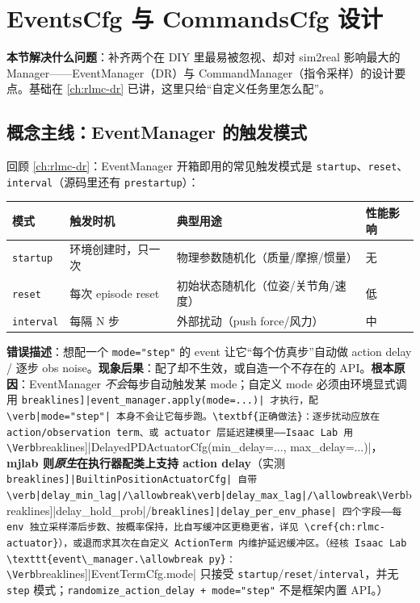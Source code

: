 \section{EventsCfg 与 CommandsCfg 设计}
\label{sec:rlmc-diy-events}

\textbf{本节解决什么问题}：补齐两个在 DIY 里最易被忽视、却对 sim2real 影响最大的 Manager——EventManager（DR）与 CommandManager（指令采样）的设计要点。基础在 \cref{ch:rlmc-dr} 已讲，这里只给“自定义任务里怎么配”。

\subsection{概念主线：EventManager 的触发模式}
\label{sec:rlmc-diy-events-mode}

回顾 \cref{ch:rlmc-dr}：EventManager 开箱即用的常见触发模式是 \verb|startup|、\verb|reset|、\verb|interval|（源码里还有 \verb|prestartup|）：

\begin{center}
\small
\begin{tabular}{@{}lp{3.6cm}p{4.4cm}l@{}}
\toprule
模式 & 触发时机 & 典型用途 & 性能影响 \\
\midrule
\verb|startup| & 环境创建时，只一次 & 物理参数随机化（质量/摩擦/惯量） & 无 \\
\verb|reset| & 每次 episode reset & 初始状态随机化（位姿/关节角/速度） & 低 \\
\verb|interval| & 每隔 N 步 & 外部扰动（push force/风力） & 中 \\
\bottomrule
\end{tabular}
\end{center}

\begin{pitfall}
\textbf{错误描述}：想配一个 \verb|mode="step"| 的 event 让它“每个仿真步”自动做 action delay / 逐步 obs noise。\textbf{现象后果}：配了却不生效，或自造一个不存在的 API。\textbf{根本原因}：EventManager \emph{不会}每步自动触发某 mode；自定义 mode 必须由环境显式调用 \Verb[breaklines]|event_manager.apply(mode=...)| 才执行，配 \verb|mode="step"| 本身不会让它每步跑。\textbf{正确做法}：逐步扰动应放在 action/observation term、或 actuator 层延迟建模里——Isaac Lab 用 \Verb[breaklines]|DelayedPDActuatorCfg(min_delay=..., max_delay=...)|，\textbf{mjlab 则\emph{原生}在执行器配类上支持 action delay}（实测 \Verb[breaklines]|BuiltinPositionActuatorCfg| 自带 \verb|delay_min_lag|/\allowbreak\verb|delay_max_lag|/\allowbreak\Verb[breaklines]|delay_hold_prob|/\allowbreak\Verb[breaklines]|delay_per_env_phase| 四个字段——每 env 独立采样滞后步数、按概率保持，比自写缓冲区更稳更省，详见 \cref{ch:rlmc-actuator}），或退而求其次在自定义 ActionTerm 内维护延迟缓冲区。（经核 Isaac Lab \texttt{event\_manager.\allowbreak py}：\Verb[breaklines]|EventTermCfg.mode| 只接受 \verb|startup|/\allowbreak\verb|reset|/\allowbreak\verb|interval|，并无 \verb|step| 模式；\texttt{randomize\_action\_delay + mode="step"} 不是框架内置 API。）
\end{pitfall}

